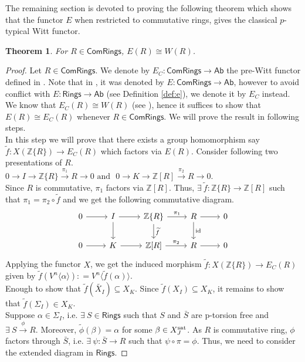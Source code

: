 \documentclass[11pt]{amsart}
\theoremstyle{plain}
\newtheorem{theorem}[thm]{Theorem}
\theoremstyle{definition}
\renewcommand{\tilde}{\widetilde}
\newcommand{\sat}{{\rm sat}}
\newcommand{\Z}{{\mathbb Z}}
\newcommand{\ab}[1]{\langle {#1} \rangle}
\newcommand{\Rings}{{\mathsf{Rings}}}
\newcommand{\Com}{{\mathsf{ComRings}}}
\newcommand{\Ab}{{\mathsf{Ab}}}
\begin{document}
\noindent The remaining section is devoted to proving the following theorem which shows that the functor $E$ when restricted to commutative rings, gives the classical $p$-typical Witt functor.  
\begin{theorem}\label{e=e_c}For $R \in \Com$, $E(R) \cong W(R)$.
\end{theorem}
\begin{proof} Let $ R \in \Com$. We denote by $E_C: \Com \to \Ab$ the pre-Witt functor defined in \cite[Section 2]{ps}. Note that in \cite{ps}, it was denoted by $E :\Com \to \Ab$, however to avoid conflict with  $E:\Rings \to \Ab$ (see Definition \ref{def:e}), we denote it by $E_C$ instead. We know that $E_C(R) \cong W(R)$ (see \cite[Page 561]{cd}), hence it suffices to show that $E(R)\cong E_C(R)$ whenever $R \in \Com$. We will prove the result in following steps. \\

 In this step we will prove that there exists a group homomorphism say $\tilde{f}: X(\Z\{R\}) \to E_C(R)$ which factors via $E(R)$. Consider following two presentations of $R$.\\
\vspace{3mm}
 $0 \to I \to \Z\{R\} \stackrel{\pi_1}{\longrightarrow} R \to 0 \text{ \ and \ }$ 
 $0 \to K \to \Z[R] \stackrel{\pi_2}{\longrightarrow} R \to 0$. \\
 Since $R$ is commutative, $\pi_1$ factors via $\Z[R]$. Thus,  $\exists \ \tilde{f}:  \Z\{R\} \to \Z[R]$ such that $\pi_1 = \pi_2 \circ \tilde{f}$ and we get the following commutative diagram.
\[\begin{tikzcd}
0 \arrow[r] & I \arrow[r] \arrow[d]  & \Z\{R\} \arrow[r,"\pi_1"]\arrow[d, "\tilde{f}"]           & R \arrow[r]\arrow[d, "\text{id}"]          & 0 \\
0 \arrow[r] & K \arrow[r]           & \Z[R] \arrow[r,"\pi_2"]           & R \arrow[r]           & 0 
\end{tikzcd}\]
Applying the functor $X$, we get the induced morphism
$\tilde{f}: X(\Z\{R\}) \to E_C(R)$ given by $\tilde{f}(V^n\ab{\alpha}) : = V^n\ab{\tilde{f}(\alpha)}$. \\

\noindent Enough to show that $\tilde{f}(\tilde{X_I}) \subseteq X_K$. Since $\tilde{f}(X_I) \subseteq X_K$, it remains to show that $\tilde{f}(\Sigma_I) \in X_K$. \\ 

\noindent Suppose $\alpha \in \Sigma_I$, i.e. $\exists \ S \in \Rings$ such that $S$ and $\bar{S}$ are p-torsion free  and $\exists \ S \xrightarrow{\phi} R$. Moreover,  $\tilde{\phi}(\beta)=\alpha$ for some $\beta \in X_J^{\sat}$. As $R$ is commutative ring, $\phi$ factors through $\bar{S}$, i.e. $\exists \ \psi: \bar{S} \to R$ such that $\psi \circ \pi = \phi$. Thus, we need to consider the extended diagram in $\Rings$.


\end{proof}
\end{document}
